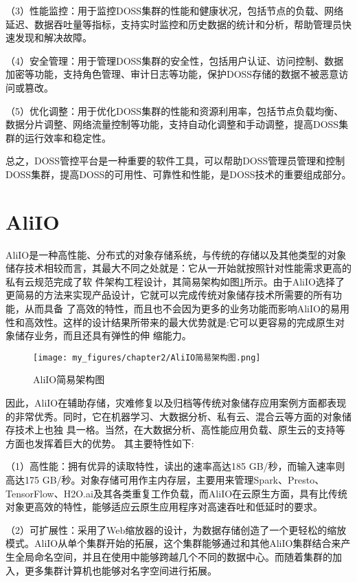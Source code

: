 （3）性能监控：用于监控DOSS集群的性能和健康状况，包括节点的负载、网络延迟、数据吞吐量等指标，支持实时监控和历史数据的统计和分析，帮助管理员快速发现和解决故障。

（4）安全管理：用于管理DOSS集群的安全性，包括用户认证、访问控制、数据加密等功能，支持角色管理、审计日志等功能\cite{kongqii}，保护DOSS存储的数据不被恶意访问或篡改。

（5）优化调整：用于优化DOSS集群的性能和资源利用率，包括节点负载均衡、数据分片调整、网络流量控制等功能，支持自动化调整和手动调整，提高DOSS集群的运行效率和稳定性。

总之，DOSS管控平台是一种重要的软件工具，可以帮助DOSS管理员管理和控制DOSS集群，提高DOSS的可用性、可靠性和性能，是DOSS技术的重要组成部分。


\section{AliIO}

AliIO是一种高性能、分布式的对象存储系统，与传统的存储以及其他类型的对象储存技术相较而言，其最大不同之处就是：它从一开始就按照针对性能需求更高的私有云规范完成了软
件架构工程设计，其简易架构如图\ref{fig:/AliIO简易架构图}所示。由于AliIO选择了更简易的方法来实现产品设计，它就可以完成传统对象储存技术所需要的所有功能，从而具备
了高效的特性，而且也不会因为更多的业务功能而影响AliIO的易用性和高效性。这样的设计结果所带来的最大优势就是:它可以更容易的完成原生对象储存业务，而且还具有弹性的伸
缩能力。

\begin{figure}[h]
    \centering
    \texttt{[image: my\_figures/chapter2/AliIO简易架构图.png]}
    \caption{AliIO简易架构图}
    \label{fig:/AliIO简易架构图}
\end{figure}

因此，AliIO在辅助存储，灾难修复以及归档等传统对象储存应用案例方面都表现的非常优秀。同时，它在机器学习、大数据分析、私有云、混合云等方面的对象储存技术上也独
具一格。当然，在大数据分析、高性能应用负载、原生云的支持等方面也发挥着巨大的优势。
其主要特性如下:

（1）高性能：拥有优异的读取特性，读出的速率高达185 GB/秒，而输入速率则高达175 GB/秒。对象存储可用作主内存层，主要用来管理Spark、Presto、TensorFlow、H2O.ai及其各类重复工作负载，而AliIO在云原生方面，具有比传统对象更高效的特性，能够适应云原生应用程序对高速吞吐和低延时的要求。

（2）可扩展性：采用了Web缩放器的设计，为数据存储创造了一个更轻松的缩放模式。AliIO从单个集群开始的拓展，这个集群能够通过和其他AliIO集群结合来产生全局命名空间，并且在使用中能够跨越几个不同的数据中心。而随着集群的加入，更多集群计算机也能够对名字空间进行拓展。

